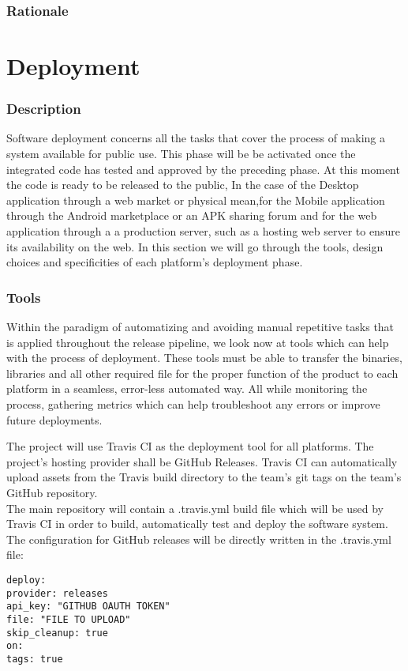 \documentclass[12pt]{report}
\begin{document}
\section{Rationale}
\part{Deployment}
\section{Description}
Software deployment concerns all the tasks that cover the process of making a system available for public use.
This phase will be be activated once the integrated code has tested and approved by the preceding
phase. At this moment the code is ready to be released to the public, In the case of the Desktop
application through a web market or physical mean,for the Mobile application through the Android
marketplace or an APK sharing forum and for the web application through a a production server, such
as a hosting web server to ensure its availability on the web. In this section we will go through
the tools, design choices and specificities of each platform's deployment phase.

\section{Tools}
Within the paradigm of automatizing and avoiding manual repetitive tasks that is applied throughout the release pipeline, we look now at tools which can help with the process of deployment. These tools must be able to transfer the binaries, libraries and all other required file for the proper function of the product to each platform in a seamless, error-less automated way. All while monitoring the process, gathering metrics which can help troubleshoot any errors or improve future deployments.

The project will use Travis CI as the deployment tool for all platforms. The project's hosting provider shall be GitHub Releases. Travis CI can automatically upload assets from the Travis build directory to the team's git tags on the team's GitHub repository. \\
The main repository will contain a .travis.yml build file which will be used by Travis CI in order to build, automatically test and deploy the software system. The configuration for GitHub releases will be directly written in the .travis.yml file: \\
\begin{lstlisting}
deploy:
provider: releases
api_key: "GITHUB OAUTH TOKEN"
file: "FILE TO UPLOAD"
skip_cleanup: true
on:
tags: true
\end{lstlisting}
\end{document}
